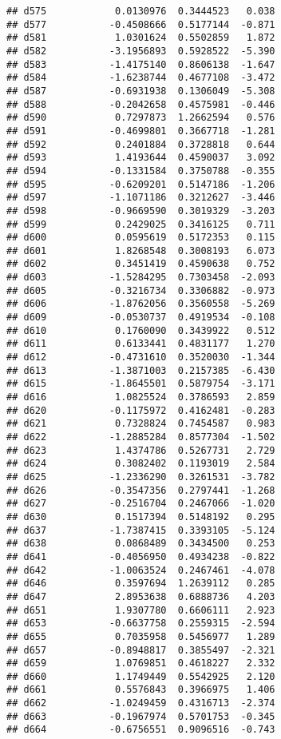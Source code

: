 \documentclass[
]{article}
\begin{document}
\begin{verbatim}
## d575            0.0130976  0.3444523   0.038
## d577           -0.4508666  0.5177144  -0.871
## d581            1.0301624  0.5502859   1.872
## d582           -3.1956893  0.5928522  -5.390
## d583           -1.4175140  0.8606138  -1.647
## d584           -1.6238744  0.4677108  -3.472
## d587           -0.6931938  0.1306049  -5.308
## d588           -0.2042658  0.4575981  -0.446
## d590            0.7297873  1.2662594   0.576
## d591           -0.4699801  0.3667718  -1.281
## d592            0.2401884  0.3728818   0.644
## d593            1.4193644  0.4590037   3.092
## d594           -0.1331584  0.3750788  -0.355
## d595           -0.6209201  0.5147186  -1.206
## d597           -1.1071186  0.3212627  -3.446
## d598           -0.9669590  0.3019329  -3.203
## d599            0.2429025  0.3416125   0.711
## d600            0.0595619  0.5172353   0.115
## d601            1.8268548  0.3008193   6.073
## d602            0.3451419  0.4590638   0.752
## d603           -1.5284295  0.7303458  -2.093
## d605           -0.3216734  0.3306882  -0.973
## d606           -1.8762056  0.3560558  -5.269
## d609           -0.0530737  0.4919534  -0.108
## d610            0.1760090  0.3439922   0.512
## d611            0.6133441  0.4831177   1.270
## d612           -0.4731610  0.3520030  -1.344
## d613           -1.3871003  0.2157385  -6.430
## d615           -1.8645501  0.5879754  -3.171
## d616            1.0825524  0.3786593   2.859
## d620           -0.1175972  0.4162481  -0.283
## d621            0.7328824  0.7454587   0.983
## d622           -1.2885284  0.8577304  -1.502
## d623            1.4374786  0.5267731   2.729
## d624            0.3082402  0.1193019   2.584
## d625           -1.2336290  0.3261531  -3.782
## d626           -0.3547356  0.2797441  -1.268
## d627           -0.2516704  0.2467066  -1.020
## d630            0.1517394  0.5148192   0.295
## d637           -1.7387415  0.3393105  -5.124
## d638            0.0868489  0.3434500   0.253
## d641           -0.4056950  0.4934238  -0.822
## d642           -1.0063524  0.2467461  -4.078
## d646            0.3597694  1.2639112   0.285
## d647            2.8953638  0.6888736   4.203
## d651            1.9307780  0.6606111   2.923
## d653           -0.6637758  0.2559315  -2.594
## d655            0.7035958  0.5456977   1.289
## d657           -0.8948817  0.3855497  -2.321
## d659            1.0769851  0.4618227   2.332
## d660            1.1749449  0.5542925   2.120
## d661            0.5576843  0.3966975   1.406
## d662           -1.0249459  0.4316713  -2.374
## d663           -0.1967974  0.5701753  -0.345
## d664           -0.6756551  0.9096516  -0.743

\end{verbatim}
\end{document}
